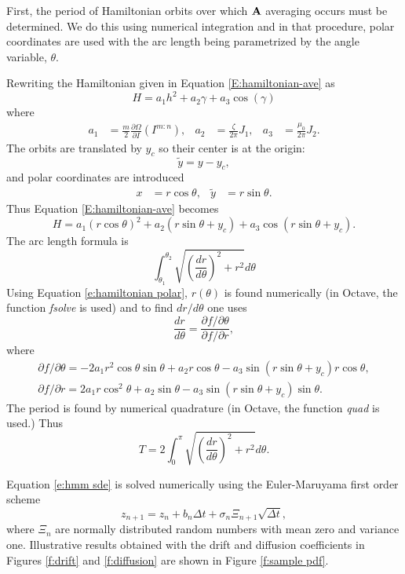 First, the period of Hamiltonian orbits over which $\operatorname{\mathbf A}$ averaging occurs must be determined. We do this using numerical integration and in that procedure, polar coordinates are used with the arc length being parametrized by the angle variable, $\theta$.

Rewriting the Hamiltonian given in Equation \eqref{E:hamiltonian-ave} as
\[
H = a_1 h^2 + a_2 \gamma + a_3 \cos(\gamma)
\]
where
\begin{align*}
a_1 &= \frac{m}{2} \frac{\partial \Omega}{\partial I} (I^{m:n}), &
a_2 &= \frac{\zeta}{2\pi} J_1, &
a_3 &= \frac{\mu_0}{2\pi} J_2.
\end{align*}
The orbits are translated by $y_c$ so their center is at the origin:
\[
\tilde y = y - y_c,
\]
and polar coordinates are introduced
\begin{align*}
x &= r \cos \theta, &
\tilde y &= r \sin \theta.
\end{align*}
Thus Equation \eqref{E:hamiltonian-ave} becomes
\begin{equation}
H = a_1 (r \cos \theta)^2 + a_2 (r \sin \theta + y_c) + a_3 \cos(r \sin \theta + y_c).
\label{e:hamiltonian polar}
\end{equation}
The arc length formula is
\[
\int_{\theta_1}^{\theta_2} \sqrt{\left(\frac{dr}{d\theta}\right)^2 + r^2} d\theta
\]
Using Equation \eqref{e:hamiltonian polar}, $r(\theta)$ is found numerically (in Octave, the function \emph{fsolve} is used) and to find $dr/d\theta$ one uses
\[
\frac{dr}{d\theta} = \frac{\partial f/\partial \theta}{\partial f/\partial r},
\]
where
\begin{gather*}
\partial f/\partial \theta = -2 a_1 r^2 \cos \theta \sin \theta + a_2 r \cos \theta - a_3 \sin(r \sin \theta + y_c) r \cos \theta,\\
\partial f/\partial r = 2 a_1 r \cos^2 \theta + a_2 \sin \theta - a_3 \sin(r \sin \theta + y_c) \sin \theta.
\end{gather*}
The period is found by numerical quadrature (in Octave, the function \emph{quad} is used.) Thus
\[
T = 2 \int_0^\pi \sqrt{\left(\frac{dr}{d\theta}\right)^2 + r^2} d\theta.
\]

Equation \eqref{e:hmm sde} is solved numerically using the Euler-Maruyama first order scheme \citep{kloeden92:_numer_solut_stoch_differ_equat}
\[
z_{n+1} = z_n + b_n \Delta t + \sigma_n \Xi_{n+1} \sqrt{\Delta t},
\]
where $\Xi_n$ are normally distributed random numbers with mean zero and variance one. Illustrative results obtained with the drift and diffusion coefficients in Figures \ref{f:drift} and \ref{f:diffusion} are shown in Figure \ref{f:sample pdf}.

